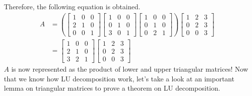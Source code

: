 \documentclass[../main.tex]{subfiles}
\begin{document}
Therefore, the following equation is obtained.
\begin{align*}
    A
    &=
    \left(
    \begin{bmatrix}
        1 & 0 & 0 \\
        2 & 1 & 0 \\
        0 & 0 & 1
    \end{bmatrix}
    \begin{bmatrix}
        1 & 0 & 0 \\
        0 & 1 & 0 \\
        3 & 0 & 1
    \end{bmatrix}
    \begin{bmatrix}
        1 & 0 & 0 \\
        0 & 1 & 0 \\
        0 & 2 & 1
    \end{bmatrix}
    \right)
    \begin{bmatrix}
        1 & 2 & 3 \\
        0 & 2 & 3 \\
        0 & 0 & 3
    \end{bmatrix} \\
    &=
    \begin{bmatrix}
        1 & 0 & 0 \\
        2 & 1 & 0 \\
        3 & 2 & 1
    \end{bmatrix}
    \begin{bmatrix}
        1 & 2 & 3 \\
        0 & 2 & 3 \\
        0 & 0 & 3
    \end{bmatrix}
\end{align*}
$A$ is now represented as the product of lower and upper triangular
matrices! Now that we know how LU decomposition work, let's take
a look at an important lemma on triangular matrices to prove a
theorem on LU decomposition.
\end{document}
